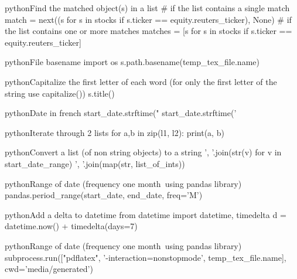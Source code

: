 \documentclass[10pt,a4paper]{article}
\begin{document}
\begin{multicols}{3}
\begin{codebox}{python}{Find the matched object(s) in a list}
# if the list contains a single match
match = next((s for s in stocks if s.ticker == equity.reuters_ticker), None)
# if the list contains one or more matches
matches = [s for s in stocks if s.ticker == equity.reuters_ticker]

\end{codebox}

\begin{codebox}{python}{File basename}
import os
s.path.basename(temp_tex_file.name)

\end{codebox}

\begin{codebox}{python}{Capitalize the first letter of each word (for only the first letter of the string use capitalize())}
s.title()

\end{codebox}

\begin{codebox}{python}{Date in french}
start_date.strftime("%
start_date.strftime('%

\end{codebox}

\begin{codebox}{python}{Iterate through 2 lists}
for a,b in zip(l1, l2):
        print(a, b)

\end{codebox}

\begin{codebox}{python}{Convert a list (of non string objects) to a string}
', '.join(str(v) for v in start_date_range)
', '.join(map(str, list_of_ints))

\end{codebox}

\begin{codebox}{python}{Range of date (frequency one month\, using pandas library)}
pandas.period_range(start_date, end_date, freq='M')

\end{codebox}

\begin{codebox}{python}{Add a delta to datetime}
from datetime import datetime, timedelta
d = datetime.now() + timedelta(days=7)

\end{codebox}

\begin{codebox}{python}{Range of date (frequency one month\, using pandas library)}
subprocess.run(["pdflatex", '-interaction=nonstopmode', temp_tex_file.name],
                       cwd='media/generated')


\end{codebox}
\end{multicols}
\end{document}
